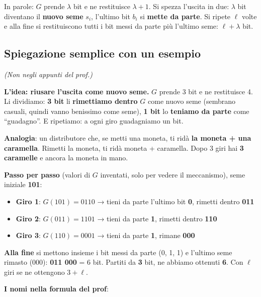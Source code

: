 In parole: \(G\) prende \(\lambda\) bit e ne restituisce \(\lambda + 1\). Si spezza l'uscita in due: \(\lambda\) bit diventano il \textbf{nuovo seme} \(s_i\), l'ultimo bit \(b_i\) si \textbf{mette da parte}. Si ripete \(\ell\) volte e alla fine si restituiscono tutti i bit messi da parte più l'ultimo seme: \(\ell + \lambda\) bit.

\subsection{Spiegazione semplice con un esempio}

\emph{(Non negli appunti del prof.)}

\textbf{L'idea: riusare l'uscita come nuovo seme.} \(G\) prende 3 bit e ne restituisce 4. Li dividiamo: \textbf{3 bit} li \textbf{rimettiamo dentro} \(G\) come nuovo seme (sembrano casuali, quindi vanno benissimo come seme), \textbf{1 bit} lo \textbf{teniamo da parte} come ``guadagno''. E ripetiamo: a ogni giro guadagniamo un bit.

\begin{nota}

\textbf{Analogia}: un distributore che, se metti una moneta, ti ridà \textbf{la moneta + una caramella}. Rimetti la moneta, ti ridà moneta + caramella. Dopo 3 giri hai \textbf{3 caramelle} e ancora la moneta in mano.

\end{nota}

\textbf{Passo per passo} (valori di \(G\) inventati, solo per vedere il meccanismo), seme iniziale \textbf{101}:

\begin{itemize}
\tightlist
\item
  \textbf{Giro 1}: \(G(101) = 0110\) → tieni da parte l'ultimo bit \textbf{0}, rimetti dentro \textbf{011}
\item
  \textbf{Giro 2}: \(G(011) = 1101\) → tieni da parte \textbf{1}, rimetti dentro \textbf{110}
\item
  \textbf{Giro 3}: \(G(110) = 0001\) → tieni da parte \textbf{1}, rimane \textbf{000}
\end{itemize}

\textbf{Alla fine} si mettono insieme i bit messi da parte (0, 1, 1) e l'ultimo seme rimasto (000): \textbf{011 000} = 6 bit. Partiti da \textbf{3} bit, ne abbiamo ottenuti \textbf{6}. Con \(\ell\) giri se ne ottengono \(3 + \ell\).

\textbf{I nomi nella formula del prof}:

